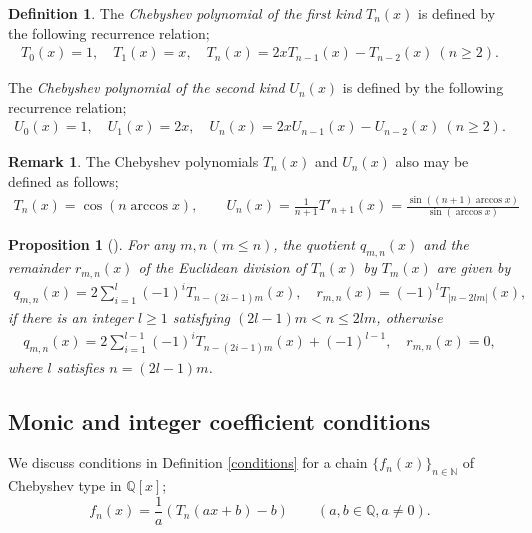 \documentclass[a4paper, 11pt]{amsart}
\numberwithin{equation}{section}
\newtheorem{prop}[thm]{Proposition}
\theoremstyle{definition}
\newtheorem{defn}[thm]{Definition}
\newtheorem{rmk}[thm]{Remark}
\newcommand{\N}{\mathbb{N}}
\newcommand{\Q}{\mathbb{Q}}
\begin{document}
\begin{defn}\label{defn-T}
The {\it Chebyshev polynomial of the first kind} $T_n(x)$ is defined by the following recurrence relation;
\begin{align}\label{rec-rel-T}
T_0(x)=1,\quad
T_1(x)=x,\quad 
T_n(x)=2xT_{n-1}(x)-T_{n-2}(x)\ (n\geq 2).
\end{align}

The {\it Chebyshev polynomial of the second kind} $U_n(x)$ is defined by the following recurrence relation;
\begin{align}\label{rec-rel-U}
U_0(x)=1,\quad
U_1(x)=2x,\quad 
U_n(x)=2xU_{n-1}(x)-U_{n-2}(x)\ (n\geq 2).
\end{align}
\begin{rmk}
The Chebyshev polynomials $T_n(x)$ and $U_n(x)$ also may be defined as follows;
\begin{align*}
T_n(x)=\cos(n\arccos x),\qquad U_n(x)=\frac1{n+1}T'_{n+1}(x)=\frac{\sin((n+1)\arccos x)}{\sin(\arccos x)}
\end{align*}
\end{rmk}
\end{defn}

\begin{prop}[]\label{E-Div}
For any $m, n\, (m\leq n)$, the quotient $q_{m,n}(x)$ and the remainder $r_{m,n}(x)$ of the Euclidean division of $T_n(x)$ by $T_m(x)$ are given by
\begin{align*}
q_{m,n}(x)=2\sum_{i=1}^l(-1)^iT_{n-(2i-1)m}(x), \quad 
r_{m,n}(x)=(-1)^lT_{|n-2lm|}(x),
\end{align*}
if there is an integer $l\geq 1$ satisfying $(2l-1)m<n\leq 2lm$, otherwise
\begin{align*}
q_{m,n}(x)=2\sum_{i=1}^{l-1}(-1)^iT_{n-(2i-1)m}(x)+(-1)^{l-1}, \quad 
r_{m,n}(x)=0,
\end{align*}
where $l$ satisfies $n=(2l-1)m$.
\end{prop}





\subsection{Monic and integer coefficient conditions}

We discuss conditions in Definition \ref{conditions} for a chain $\{f_n(x)\}_{n \in \N}$ of Chebyshev type in $\Q[x]$;
$$
f_n(x) = \frac{1}{a} (T_n(ax + b) - b) \qquad (a, b\in \Q, a\neq 0).
$$
\end{document}
